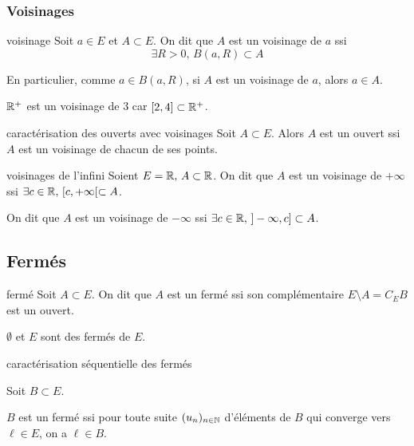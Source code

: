 \subsubsection{Voisinages}

\begin{definition}{voisinage}{}
    Soit $a \in E$ et $A \subset E$. On dit que $A$ est un voisinage de $a$ ssi
    $$ \exists R > 0, \, B(a, R) \subset A$$
\end{definition}

\begin{remarque}
    En particulier, comme $a \in B(a, R)$, si $A$ est un voisinage de $a$, alors $a \in A$.
\end{remarque}


\begin{exemple}
    $\mathbb{R}^+$ est un voisinage de $3$ car $[2, 4] \subset \mathbb{R}^+$.
\end{exemple}

\begin{proposition}{caractérisation des ouverts avec voisinages}{}
    Soit $A \subset E$. Alors $A$ est un ouvert ssi $A$ est un voisinage de chacun de ses points.
\end{proposition}

\begin{proposition}{voisinages de l'infini}{}
    Soient $E = \mathbb{R}, \, A \subset \mathbb{R}$. On dit que $A$ est un voisinage de $+\infty$
    ssi $\exists c \in \mathbb{R}, \, [c, +\infty[ \subset A$. 

    On dit que $A$ est un voisinage de $-\infty$ ssi 
    $\exists c \in \mathbb{R}, \, ]-\infty, c] \subset A$.
\end{proposition}


\subsection{Fermés}

\begin{definition}{fermé}{}
    Soit $A \subset E$. On dit que $A$ est un fermé ssi son complémentaire 
    $E \setminus A = C_E B$ est un ouvert.
\end{definition}


\begin{exemple}
    $\emptyset$ et $E$ sont des fermés de $E$. 
\end{exemple}

\begin{theoreme}{caractérisation séquentielle des fermés}{}

    Soit $B \subset E$. 

    $B$ est un fermé ssi pour toute suite $(u_n)_{n \in \mathbb{N}}$ d'éléments de $B$ qui converge 
    vers $\ell \in E$, on a $\ell \in B$.

\end{theoreme}

